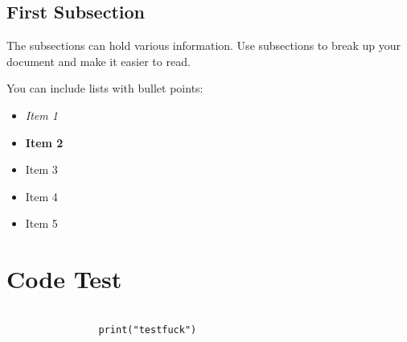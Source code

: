 \documentclass[twocolumn]{article}
\begin{document}
\subsection{First Subsection}
\label{sec:org8e32a2b}

The subsections can hold various information. Use subsections to break up your document and make it easier to read.

You can include lists with bullet points:
\begin{itemize}
\item \emph{Item 1}
\item \textbf{Item 2}
\item Item 3
\item Item 4
\item Item 5
\end{itemize}

\section{Code Test}
\label{sec:org8ff5562}

\begin{verbatim}

                print("testfuck")

\end{verbatim}
\end{document}
